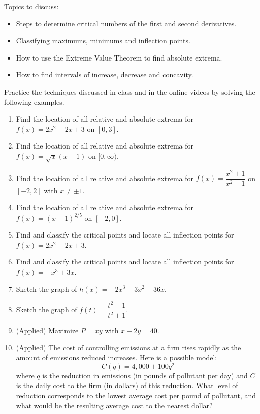 \documentclass[10pt]{book}
\theoremstyle{definition}
\theoremstyle{remark}
\begin{document}
\begin{large}
\noindent
Topics to discuss:
\begin{itemize}
\item Steps to determine critical numbers of the first and second derivatives. 
\item Classifying maximums, minimums and inflection points. 
\item How to use the Extreme Value Theorem to find absolute extrema.
\item How to find intervals of increase, decrease and concavity. 
\end{itemize}
\newpage

\noindent
Practice the techniques discussed in class and in the online videos by solving the following examples. 
\begin{enumerate}
\item Find the location of all relative and absolute extrema for $f(x) = 2x^2-2x+3$ on $[0,3]$.\vfil\vfil
\item Find the location of all relative and absolute extrema for $f(x) = \sqrt{x}(x+1)$ on $[0,\infty)$.\vfil
\newpage

\item Find the location of all relative and absolute extrema for $f(x) = \dfrac{x^2+1}{x^2-1}$ on $[-2,2]$ with $x \not = \pm 1$.\vfil\vfil
\item Find the location of all relative and absolute extrema for $f(x) = (x+1)^{2/5}$ on $[-2,0]$.\vfil
\newpage

\item Find and classify the critical points and locate all inflection points for $f(x) = 2x^2-2x+3$. \vfil\vfil
\item Find and classify the critical points and locate all inflection points for $f(x) = -x^3 + 3x$.\vfil
\newpage

\item Sketch the graph of $h(x) = -2x^3 - 3x^2 + 36x$.\vfil\vfil
\item Sketch the graph of $f(t) = \dfrac{t^2 - 1}{t^2 + 1}$.\vfil
\newpage

\item (Applied) Maximize $P = xy$ with $x + 2y = 40$. \vfil
\item (Applied) The cost of controlling emissions at a firm rises rapidly as the amount of emissions reduced increases. Here is a possible model: \[C(q) = 4,000 + 100q^2\] where $q$ is the reduction in emissions (in pounds of pollutant per day) and $C$ is the daily cost to the firm (in dollars) of this reduction. What level of reduction corresponds to the lowest average cost per pound of pollutant, and what would be the resulting average cost to the nearest dollar?\vfil
\end{enumerate}
\end{large}
\newpage
\end{document}
